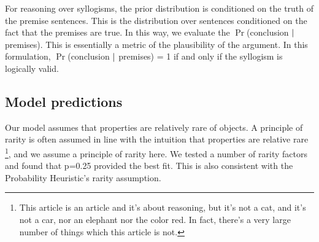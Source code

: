 \documentclass[10pt,letterpaper]{article}
\begin{document}
For reasoning over syllogisms, the prior distribution is conditioned on the truth of the premise sentences. This is the distribution over sentences conditioned on the fact that the premises are true. In this way, we evaluate the $\Pr$(conclusion $\arrowvert$ premises). This is essentially a metric of the plausibility of the argument. In this formulation, $\Pr$(conclusion $\arrowvert$ premises) = 1 if and only if the syllogism is logically valid.

%
%
%
%
%

\subsection{Model predictions}

Our model assumes that properties are relatively rare of objects.  A principle of rarity is often assumed in line with the intuition that properties are relative rare \footnote{This article is an article and it's about reasoning, but it's not a cat, and it's not a car, nor an elephant nor the color red. In fact, there's a very large number of things which this article is not.}, and we assume a principle of rarity here. We tested a number of rarity factors and found that p=0.25 provided the best fit. This is also consistent with the Probability Heuristic's rarity assumption. 
\end{document}
